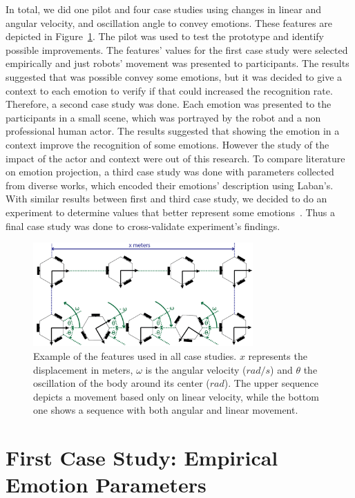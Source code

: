 In total, we did one pilot and four case studies using changes in linear and angular velocity, and oscillation angle to convey emotions. These features are depicted in Figure~\ref{fig:features}. The pilot was used to test the prototype and identify possible improvements. The features' values for the first case study were selected empirically and just robots' movement was presented to participants. The results suggested that was possible convey some emotions, but it was decided to give a context to each emotion to verify if that could increased the recognition rate. Therefore, a second case study was done. Each emotion was presented to the participants in a small scene, which was portrayed by the robot and a non professional human actor. The results suggested that showing the emotion in a context improve the recognition of some emotions. However the study of the impact of the actor and context were out of this research. To compare literature on emotion projection, a third case study was done with parameters collected from diverse works, which encoded their emotions' description using Laban's. With similar results between first and third case study, we decided to do an experiment to determine values that better represent some emotions~\cite{Angel2017}. Thus a final case study was done to cross-validate experiment's findings.

\begin{figure}[h]
	\centering
	\includegraphics[width=0.75\textwidth]{./Images/ExampleMovement.png}
	\caption{Example of the features used in all case studies. $x$ represents the displacement in meters, $\omega$ is the angular velocity ($rad/s$) and $\theta$ the oscillation of the body around its center ($rad$). The upper sequence depicts a movement based only on linear velocity, while the bottom one shows a sequence with both angular and linear movement.}
	\label{fig:features}
\end{figure} 


\section{First Case Study: Empirical Emotion Parameters}

